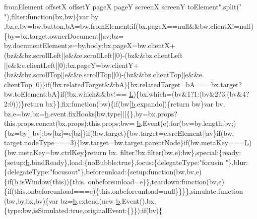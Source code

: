 \begin{DoxyCode}
{       fromElement offsetX offsetY pageX pageY screenX screenY toElement"}.split(\textcolor{stringliteral}{" "}),filter:\textcolor{keyword}{function}(bx,bw)\{var by
      ,bz,e,bv=bw.button,bA=bw.fromElement;\textcolor{keywordflow}{if}(bx.pageX==null&&bw.clientX!=null)\{by=bx.target.ownerDocument||av;bz=
      by.documentElement;e=by.body;bx.pageX=bw.clientX+(bz&&bz.scrollLeft||e&&e.scrollLeft||0)-(bz&&bz.clientLeft
      ||e&&e.clientLeft||0);bx.pageY=bw.clientY+(bz&&bz.scrollTop||e&&e.scrollTop||0)-(bz&&bz.clientTop||e&&e.
      clientTop||0)\}\textcolor{keywordflow}{if}(!bx.relatedTarget&&bA)\{bx.relatedTarget=bA===bx.target?bw.toElement:bA\}\textcolor{keywordflow}{if}(!bx.which&&bv!==
      \hyperlink{docs_2_programmer's_manual_2html_2jquery_8js_a38ee4c0b5f4fe2a18d0c783af540d253}{L})\{bx.which=(bv&1?1:(bv&2?3:(bv&4?2:0)))\}\textcolor{keywordflow}{return} bx\}\},fix:\textcolor{keyword}{function}(bw)\{\textcolor{keywordflow}{if}(bw[\hyperlink{docs_2_programmer's_manual_2html_2jquery_8js_aa4026ad5544b958e54ce5e106fa1c805}{b}.expando])\{\textcolor{keywordflow}{return} bw\}var bv,
      bz,e=bw,bx=\hyperlink{docs_2_programmer's_manual_2html_2jquery_8js_aa4026ad5544b958e54ce5e106fa1c805}{b}.event.fixHooks[bw.type]||\{\},by=bx.props?this.props.concat(bx.props):this.props;bw=
      \hyperlink{docs_2_programmer's_manual_2html_2jquery_8js_aa4026ad5544b958e54ce5e106fa1c805}{b}.Event(e);\textcolor{keywordflow}{for}(bv=by.length;bv;)\{bz=by[--bv];bw[bz]=e[bz]\}\textcolor{keywordflow}{if}(!bw.target)\{bw.target=e.srcElement||av\}\textcolor{keywordflow}{if}(bw.
      target.nodeType===3)\{bw.target=bw.target.parentNode\}\textcolor{keywordflow}{if}(bw.metaKey===\hyperlink{docs_2_programmer's_manual_2html_2jquery_8js_a38ee4c0b5f4fe2a18d0c783af540d253}{L})\{bw.metaKey=bw.ctrlKey\}\textcolor{keywordflow}{return} bx.
      filter?bx.filter(bw,e):bw\},special:\{ready:\{setup:\hyperlink{docs_2_programmer's_manual_2html_2jquery_8js_aa4026ad5544b958e54ce5e106fa1c805}{b}.bindReady\},load:\{noBubble:\textcolor{keyword}{true}\},focus:\{delegateType:\textcolor{stringliteral}{"focusin
      "}\},blur:\{delegateType:\textcolor{stringliteral}{"focusout"}\},beforeunload:\{setup:\textcolor{keyword}{function}(bw,bv,e)\{\textcolor{keywordflow}{if}(\hyperlink{docs_2_programmer's_manual_2html_2jquery_8js_aa4026ad5544b958e54ce5e106fa1c805}{b}.isWindow(\textcolor{keyword}{this}))\{this.
      onbeforeunload=e\}\},teardown:\textcolor{keyword}{function}(bv,e)\{\textcolor{keywordflow}{if}(this.onbeforeunload===e)\{this.onbeforeunload=null\}\}\}\},simulate:\textcolor{keyword}{function}
      (bw,by,bx,bv)\{var bz=\hyperlink{docs_2_programmer's_manual_2html_2jquery_8js_aa4026ad5544b958e54ce5e106fa1c805}{b}.extend(\textcolor{keyword}{new} \hyperlink{docs_2_programmer's_manual_2html_2jquery_8js_aa4026ad5544b958e54ce5e106fa1c805}{b}.Event(),bx,\{type:bw,isSimulated:\textcolor{keyword}{true},originalEvent:\{\}\});\textcolor{keywordflow}{if}(bv)\{

\end{DoxyCode}
